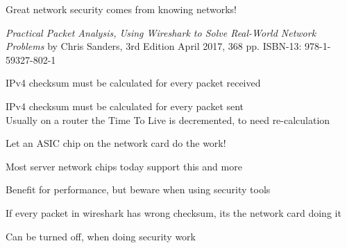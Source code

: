 \documentclass[Screen16to9,17pt]{foils}
\begin{document}
\vskip 5mm

\centerline{\Large Great network security comes from knowing networks!}






\emph{Practical Packet Analysis,
Using Wireshark to Solve Real-World Network Problems}
by Chris Sanders, 3rd Edition
April 2017, 368 pp.
ISBN-13:
978-1-59327-802-1




\begin{list1}
\item IPv4 checksum must be calculated for every packet received
\item IPv4 checksum must be calculated for every packet sent\\
Usually on a router the Time To Live is decremented, to need re-calculation
\vskip 1cm
\item Let an ASIC chip on the network card do the work!
\item Most server network chips today support this and more
\item Benefit for performance, but beware when using security tools
\item If every packet in wireshark has wrong checksum, its the network card doing it
\item Can be turned off, when doing security work
\end{list1}
\vskip 1cm


\end{document}
